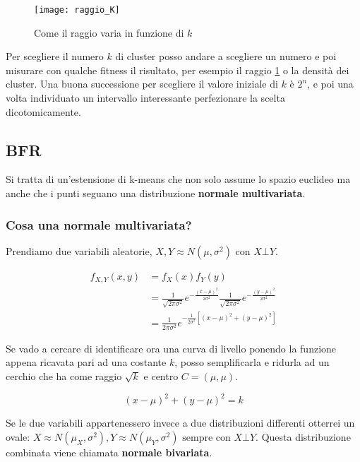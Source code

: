 \documentclass[\main/main.tex]{subfiles}
\begin{document}
\begin{figure}
  \texttt{[image: raggio\_K]}
  \caption{Come il raggio varia in funzione di $k$}
  \label{fig:raggio}
\end{figure}

Per scegliere il numero $k$ di cluster posso andare a scegliere un numero e poi misurare con qualche fitness il risultato, per esempio il raggio \ref{fig:raggio} o la densità dei cluster. Una buona successione per scegliere il valore iniziale di $k$ è $2^n$, e poi una volta individuato un intervallo interessante perfezionare la scelta dicotomicamente.

\subsection{BFR}
Si tratta di un'estensione di k-means che non solo assume lo spazio euclideo ma anche che i punti seguano una distribuzione \textbf{normale multivariata}.

\subsubsection{Cosa  una normale multivariata?}
Prendiamo due variabili aleatorie, $X,Y \approx N(\mu, \sigma^2) \text{ con } X\bot Y$.

\begin{align}
  f_{X,Y} (x,y) & =f_X (x) f_Y(y)                                                                                                                       \\
                & = \frac{1}{\sqrt{2 \pi \sigma^2}} e^{- \frac{(x-\mu)^2}{2\sigma^2}} \frac{1}{\sqrt{2 \pi \sigma^2}} e^{- \frac{(y-\mu)^2}{2\sigma^2}} \\
                & = \frac{1}{2 \pi \sigma^2} e^{-\frac{1}{2\sigma^2}[(x-\mu)^2+(y-\mu)^2]}
\end{align}

Se vado a cercare di identificare ora una curva di livello ponendo la funzione appena ricavata pari ad una costante $k$, posso semplificarla e ridurla ad un cerchio che ha come raggio $\sqrt{k}$ e centro $C = (\mu,\mu)$.

\[
  (x-\mu)^2 + (y-\mu)^2 = k
\]

Se le due variabili appartenessero invece a due distribuzioni differenti otterrei un ovale: $X \approx N(\mu_X, \sigma^2), Y \approx N(\mu_Y, \sigma^2) \text{ sempre con } X\bot Y$. Questa distribuzione combinata viene chiamata \textbf{normale bivariata}.
\end{document}
